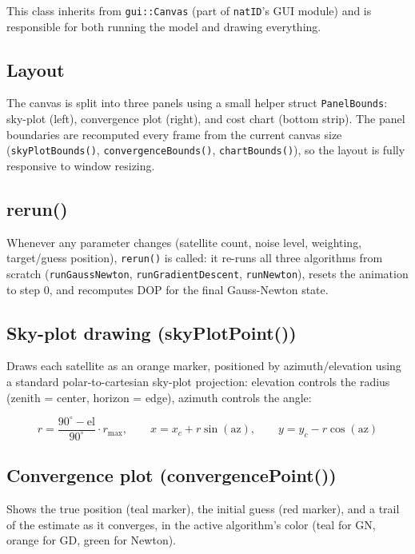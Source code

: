 \documentclass[11pt]{article}
\begin{document}
This class inherits from \texttt{gui::Canvas} (part of \texttt{natID}'s GUI module) and is responsible for both running the model and drawing everything. 

\subsection{Layout}

The canvas is split into three panels using a small helper struct \texttt{PanelBounds}: sky-plot (left), convergence plot (right), and cost chart (bottom strip). The panel boundaries are recomputed every frame from the current canvas size (\texttt{skyPlotBounds()}, \texttt{convergenceBounds()}, \texttt{chartBounds()}), so the layout is fully responsive to window resizing.

\subsection{rerun()}

Whenever any parameter changes (satellite count, noise level, weighting, target/guess position), \texttt{rerun()} is called: it re-runs all three algorithms from scratch (\texttt{runGaussNewton}, \texttt{runGradientDescent}, \texttt{runNewton}), resets the animation to step 0, and recomputes DOP for the final Gauss-Newton state.

\subsection{Sky-plot drawing (skyPlotPoint())}

Draws each satellite as an orange marker, positioned by azimuth/elevation using a standard polar-to-cartesian sky-plot projection: elevation controls the radius (zenith = center, horizon = edge), azimuth controls the angle:

\[
r = \frac{90^\circ - \text{el}}{90^\circ} \cdot r_{\max}, \qquad
x = x_c + r\sin(\text{az}), \qquad y = y_c - r\cos(\text{az})
\]

\subsection{Convergence plot (convergencePoint())}

Shows the true position (teal marker), the initial guess (red marker), and a trail of the estimate as it converges, in the active algorithm's color (teal for GN, orange for GD, green for Newton). 
\end{document}
